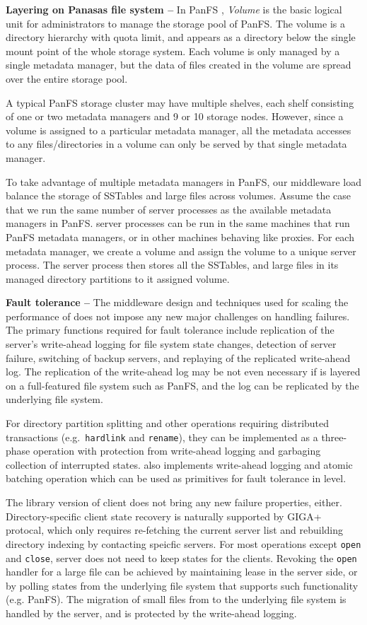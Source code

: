 \textbf{Layering on Panasas file system -- }
In PanFS \cite{PanFS}, \textit{Volume} is the basic logical unit
for administrators to manage the storage pool of PanFS.
The volume is a directory hierarchy with quota limit, and appears
as a directory below the single mount point of the whole storage system.
Each volume is only managed by a single metadata manager, but
the data of files created in the volume are spread over the entire storage pool.

A typical PanFS storage cluster may have multiple shelves,
each shelf consisting of one or two metadata managers and 9 or 10 storage nodes.
However, since a volume is assigned to a particular metadata manager,
all the metadata accesses to any files/directories in a volume
can only be served by that single metadata manager.

To take advantage of multiple metadata managers in PanFS,
our middleware load balance the storage of SSTables and large files across volumes.
Assume the case that we run the same number of \sys server processes
as the available metadata managers in PanFS.
\sys server processes can be run in the same machines that run PanFS metadata managers,
or in other machines behaving like proxies.
For each metadata manager, we create a volume and assign the volume
to a unique \sys server process.
The \sys server process then stores all the SSTables,
and large files in its managed directory partitions to it assigned volume.

\textbf{Fault tolerance -- }
The middleware design and techniques used for scaling the performance
of \sys does not impose any new major challenges on handling failures.
The primary functions required for fault tolerance include
replication of the \sys server's write-ahead logging for file system
state changes, detection of server failure, switching of backup servers,
and replaying of the replicated write-ahead log.
The replication of the write-ahead log may be not even necessary
if \sys is layered on a full-featured file system such as PanFS,
and the log can be replicated by the underlying file system.

For directory partition splitting and other operations requiring
distributed transactions (e.g.\texttt{ hardlink} and \texttt{rename}),
they can be implemented as a three-phase operation with protection
from write-ahead logging and garbaging collection of interrupted states.
\ldb also implements write-ahead logging and atomic batching operation
which can be used as primitives for fault tolerance in \tfs level.


The library version of client does not bring any new failure properties, either.
Directory-specific client state recovery is naturally supported by GIGA+
protocal, which only requires re-fetching the current server list and
rebuilding directory indexing by contacting speicfic servers.
For most operations except \texttt{open} and \texttt{close},
\sys server does not need to keep states for the clients.
Revoking the \texttt{open} handler for a large file can be achieved by
maintaining lease in the server side,
or by polling states from the underlying file system that
supports such functionality (e.g. PanFS).
The migration of small files from \tfs to the underlying file system is
handled by the \sys server, and is protected by the write-ahead logging.
